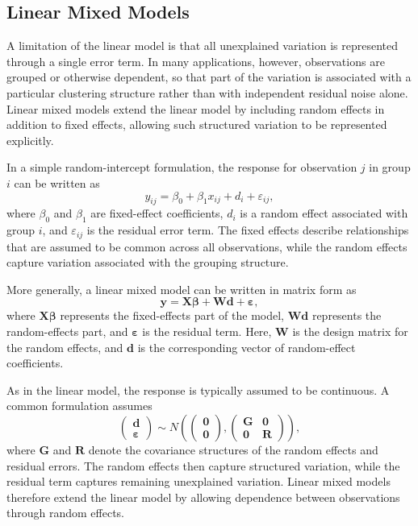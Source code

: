 \subsection{Linear Mixed Models}

A limitation of the linear model is that all unexplained variation is represented through a single error term. In many applications, however, observations are grouped or otherwise dependent, so that part of the variation is associated with a particular clustering structure rather than with independent residual noise alone. Linear mixed models extend the linear model by including random effects in addition to fixed effects, allowing such structured variation to be represented explicitly.

In a simple random-intercept formulation, the response for observation $j$ in group $i$ can be written as
%
\begin{equation}
y_{ij} = \beta_0 + \beta_1 x_{ij} + d_i + \varepsilon_{ij},
\end{equation}
%
where $\beta_0$ and $\beta_1$ are fixed-effect coefficients, $d_i$ is a random effect associated with group $i$, and $\varepsilon_{ij}$ is the residual error term. The fixed effects describe relationships that are assumed to be common across all observations, while the random effects capture variation associated with the grouping structure.

More generally, a linear mixed model can be written in matrix form as
%
\begin{equation}
\mathbf{y} = \mathbf{X}\boldsymbol{\beta} + \mathbf{W}\mathbf{d} + \boldsymbol{\varepsilon},
\end{equation}
%
where $\mathbf{X}\boldsymbol{\beta}$ represents the fixed-effects part of the model, $\mathbf{W}\mathbf{d}$ represents the random-effects part, and $\boldsymbol{\varepsilon}$ is the residual term. Here, $\mathbf{W}$ is the design matrix for the random effects, and $\mathbf{d}$ is the corresponding vector of random-effect coefficients.

As in the linear model, the response is typically assumed to be continuous. A common formulation assumes
%
\begin{equation}
\begin{pmatrix}
\mathbf{d} \\
\boldsymbol{\varepsilon}
\end{pmatrix}
\sim
N\left(
\begin{pmatrix}
\mathbf{0} \\
\mathbf{0}
\end{pmatrix},
\begin{pmatrix}
\mathbf{G} & \mathbf{0} \\
\mathbf{0} & \mathbf{R}
\end{pmatrix}
\right),
\end{equation}
%
where $\mathbf{G}$ and $\mathbf{R}$ denote the covariance structures of the random effects and residual errors. The random effects then capture structured variation, while the residual term captures remaining unexplained variation. Linear mixed models therefore extend the linear model by allowing dependence between observations through random effects.

